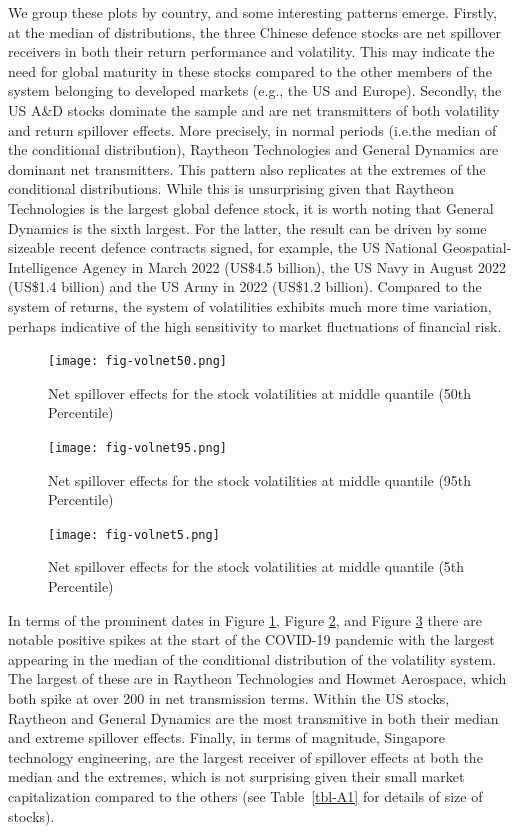 \documentclass[
  letterpaper,
  DIV=11,
  numbers=noendperiod]{scrartcl}
\begin{document}
We group these plots by country, and some interesting patterns emerge.
Firstly, at the median of distributions, the three Chinese defence
stocks are net spillover receivers in both their return performance and
volatility. This may indicate the need for global maturity in these
stocks compared to the other members of the system belonging to
developed markets (e.g., the US and Europe). Secondly, the US A\&D
stocks dominate the sample and are net transmitters of both volatility
and return spillover effects. More precisely, in normal periods (i.e.the
median of the conditional distribution), Raytheon Technologies and
General Dynamics are dominant net transmitters. This pattern also
replicates at the extremes of the conditional distributions. While this
is unsurprising given that Raytheon Technologies is the largest global
defence stock, it is worth noting that General Dynamics is the sixth
largest. For the latter, the result can be driven by some sizeable
recent defence contracts signed, for example, the US National
Geospatial-Intelligence Agency in March 2022 (US\$4.5 billion), the US
Navy in August 2022 (US\$1.4 billion) and the US Army in 2022 (US\$1.2
billion). Compared to the system of returns, the system of volatilities
exhibits much more time variation, perhaps indicative of the high
sensitivity to market fluctuations of financial risk.

\begin{figure}
\centering
  \texttt{[image: fig-volnet50.png]}
  \caption{Net spillover effects for the stock volatilities at middle quantile (50th Percentile)}
  \label{fig:volnet50}
\end{figure}

\begin{figure}
\centering
  \texttt{[image: fig-volnet95.png]}
  \caption{Net spillover effects for the stock volatilities at middle quantile (95th Percentile)}
  \label{fig:volnet95}
\end{figure}

\begin{figure}
\centering
  \texttt{[image: fig-volnet5.png]}
  \caption{Net spillover effects for the stock volatilities at middle quantile (5th Percentile)}
  \label{fig:volnet5}
\end{figure}

In terms of the prominent dates in Figure \ref{fig:volnet50}, Figure
\ref{fig:volnet95}, and Figure \ref{fig:volnet5} there are notable
positive spikes at the start of the COVID-19 pandemic with the largest
appearing in the median of the conditional distribution of the
volatility system. The largest of these are in Raytheon Technologies and
Howmet Aerospace, which both spike at over 200 in net transmission
terms. Within the US stocks, Raytheon and General Dynamics are the most
transmitive in both their median and extreme spillover effects. Finally,
in terms of magnitude, Singapore technology engineering, are the largest
receiver of spillover effects at both the median and the extremes, which
is not surprising given their small market capitalization compared to
the others (see Table~\ref{tbl-A1} for details of size of stocks).
\end{document}
